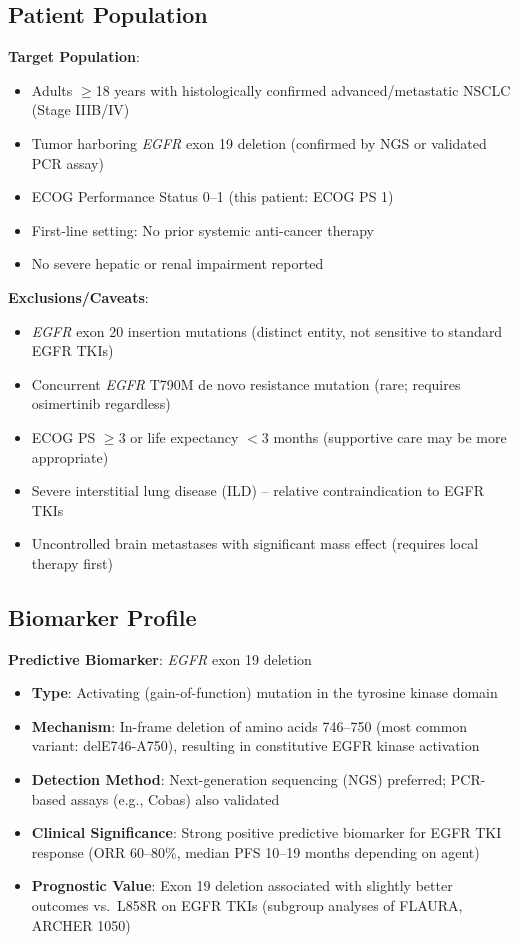 \documentclass[10pt,letterpaper]{article}
\begin{document}
\subsection{Patient Population}

\textbf{Target Population}:
\begin{itemize}
\item Adults $\geq$18 years with histologically confirmed advanced/metastatic NSCLC (Stage IIIB/IV)
\item Tumor harboring \textit{EGFR} exon 19 deletion (confirmed by NGS or validated PCR assay)
\item ECOG Performance Status 0--1 (this patient: ECOG PS 1)
\item First-line setting: No prior systemic anti-cancer therapy
\item No severe hepatic or renal impairment reported
\end{itemize}

\textbf{Exclusions/Caveats}:
\begin{itemize}
\item \textit{EGFR} exon 20 insertion mutations (distinct entity, not sensitive to standard EGFR TKIs)
\item Concurrent \textit{EGFR} T790M de novo resistance mutation (rare; requires osimertinib regardless)
\item ECOG PS $\geq$3 or life expectancy $<$3 months (supportive care may be more appropriate)
\item Severe interstitial lung disease (ILD) -- relative contraindication to EGFR TKIs
\item Uncontrolled brain metastases with significant mass effect (requires local therapy first)
\end{itemize}

\subsection{Biomarker Profile}

\textbf{Predictive Biomarker}: \textit{EGFR} exon 19 deletion
\begin{itemize}
\item \textbf{Type}: Activating (gain-of-function) mutation in the tyrosine kinase domain
\item \textbf{Mechanism}: In-frame deletion of amino acids 746--750 (most common variant: delE746-A750), resulting in constitutive EGFR kinase activation
\item \textbf{Detection Method}: Next-generation sequencing (NGS) preferred; PCR-based assays (e.g., Cobas\textregistered) also validated
\item \textbf{Clinical Significance}: Strong positive predictive biomarker for EGFR TKI response (ORR 60--80\%, median PFS 10--19 months depending on agent)
\item \textbf{Prognostic Value}: Exon 19 deletion associated with slightly better outcomes vs.~L858R on EGFR TKIs (subgroup analyses of FLAURA, ARCHER 1050)
\end{itemize}
\end{document}
